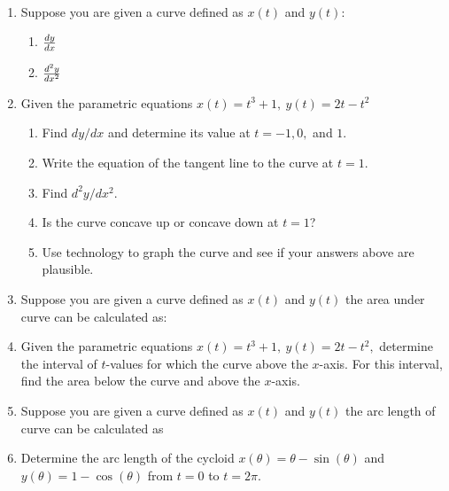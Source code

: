 \documentclass[11pt]{amsart}
\begin{document}
\begin{center}
  \large
  \\
   
\end{center}

\begin{enumerate}
\item Suppose you are given a curve defined as $x(t)$ and $y(t)$: \\
	\begin{enumerate}
	\item ${\Large{\frac{dy}{dx}}}$
	\vspace{.5 in}
	\item ${\Large{\frac{d^2y}{dx^2}}}$
	\vspace{.5 in}
	\end{enumerate}
\item Given the parametric equations $x(t)=t^3+1, \: y(t)=2t-t^2$ 	
	\begin{enumerate}
	\item Find $dy/dx$ and determine its value at $t=-1,0,$ and $1.$ 
	\vfill
	\vfill
	\item Write the equation of the tangent line to the curve at $t=1.$ 
	\vspace{1in}
	
	\item Find $d^2y/dx^2$.
	\vfill
	\item Is the curve concave up or concave down at $t=1$?
	\vspace{1in}
	\item Use technology to graph the curve and see if your answers above are plausible.
	\end{enumerate}
\newpage
\item Suppose you are given a curve defined as $x(t)$ and $y(t)$ the area under curve can be calculated as:
	\vspace{1 in}
\item Given the parametric equations $x(t)=t^3+1, \: y(t)=2t-t^2,$ determine the interval of $t$-values for which the curve above the $x$-axis. For this interval, find the area below the curve and above the $x$-axis. 
	\vfill
	
\item Suppose you are given a curve defined as $x(t)$ and $y(t)$ the arc length of curve can be calculated as
\vspace{1 in}
\item Determine the arc length of the cycloid $x(\theta)=\theta-\sin(\theta)$ and $y(\theta)=1-\cos(\theta)$ from $t=0$ to $t=2 \pi.$
	\vfill

\end{enumerate}
\end{document}
